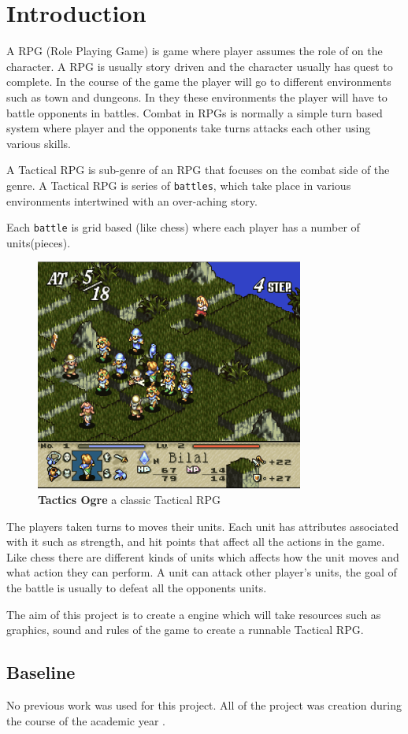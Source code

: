 \section{Introduction} 
\label{introduction}
       
A RPG (Role Playing Game) is game where player assumes the role of on the character. A RPG is usually story driven and the character usually has quest to complete. In the course of the game the player will go to different environments such as town and dungeons. In they these environments the player will have to battle opponents in battles. Combat in RPGs is normally a simple turn based system where player and the opponents take turns attacks each other using various skills. 

A Tactical RPG is sub-genre of an RPG that focuses on the combat side of the genre. A Tactical RPG is series of \texttt{battles}, which take place in various environments intertwined with an over-aching story.

Each \texttt{battle} is grid based (like chess) where each player has a number of units(pieces). 
\begin{figure}
	[htbp] \centering 
	\includegraphics[height=3in]{figures/TRPG.png} \caption{\textbf{Tactics Ogre}\cite{to} a classic Tactical RPG } \label{fig:figures_TRPG} 
\end{figure}
The players taken turns to moves their units. Each unit has attributes associated with it such as strength, and hit points that affect all the actions in the game. Like chess there are different kinds of units which affects how the unit moves and what action they can perform. A unit can attack other player's units, the goal of the battle is usually to defeat all the opponents units.

The aim of this project is to create a engine which will take resources such as graphics, sound and rules of the game to create a runnable Tactical RPG.

\subsection{Baseline} %
\label{sub:baseline}

No previous work was used for this project. All of the project was creation during the course of the academic year
.

